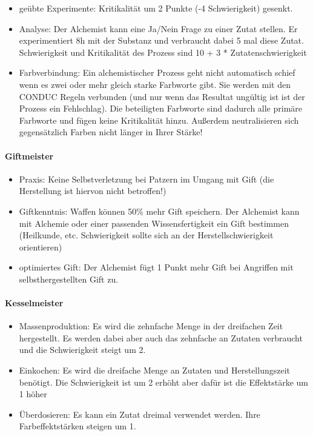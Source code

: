 \documentclass{article}
\begin{document}
\begin{itemize}
\item geübte Experimente: Kritikalität um 2 Punkte (-4 Schwierigkeit) gesenkt.
\item Analyse: Der Alchemist kann eine Ja/Nein Frage zu einer Zutat stellen. Er experimentiert 8h mit der Substanz und verbraucht dabei 5 mal diese Zutat. Schwierigkeit und Kritikalität des Prozess sind 10 + 3 * Zutatenschwierigkeit
\item Farbverbindung: Ein alchemistischer Prozess geht nicht automatisch schief wenn es zwei oder mehr gleich starke Farbworte gibt. Sie werden mit den CONDUC Regeln verbunden (und nur wenn das Resultat ungültig ist ist der Prozess ein Fehlschlag). Die beteiligten Farbworte sind dadurch alle primäre Farbworte und fügen keine Kritikalität hinzu. Außerdem neutralisieren sich gegensätzlich Farben nicht länger in Ihrer Stärke!
\end{itemize}

\paragraph{Giftmeister}

\begin{itemize}
\item Praxis: Keine Selbstverletzung bei Patzern im Umgang mit Gift (die Herstellung ist hiervon nicht betroffen!)
\item Giftkenntnis: Waffen können 50\% mehr Gift speichern. Der Alchemist kann mit Alchemie oder einer passenden Wissensfertigkeit ein Gift bestimmen (Heilkunde, etc. Schwierigkeit sollte sich an der Herstellschwierigkeit orientieren)
\item optimiertes Gift: Der Alchemist fügt 1 Punkt mehr Gift bei Angriffen mit selbsthergestellten Gift zu.
\end{itemize}

\paragraph{Kesselmeister}

\begin{itemize}
\item Massenproduktion: Es wird die zehnfache Menge in der dreifachen Zeit hergestellt. Es werden dabei aber auch das zehnfache an Zutaten verbraucht und die Schwierigkeit steigt um 2.
\item Einkochen: Es wird die dreifache Menge an Zutaten und Herstellungszeit benötigt. Die Schwierigkeit ist um 2 erhöht aber dafür ist die Effektstärke um 1 höher
\item Überdosieren: Es kann ein Zutat dreimal verwendet werden. Ihre Farbeffektstärken steigen um 1.
\end{itemize}
\end{document}

